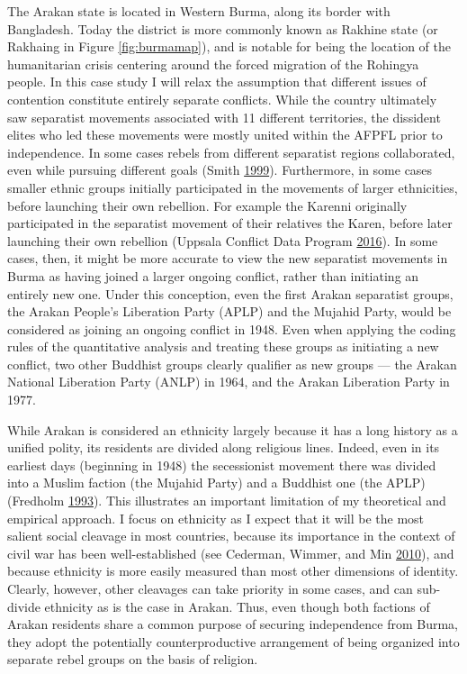 \documentclass[12pt,]{book}
\theoremstyle{definition}
\theoremstyle{definition}
\theoremstyle{definition}
\theoremstyle{remark}
\begin{document}
The Arakan state is located in Western Burma, along its border with
Bangladesh. Today the district is more commonly known as Rakhine state
(or Rakhaing in Figure \ref{fig:burmamap}), and is notable for being the
location of the humanitarian crisis centering around the forced
migration of the Rohingya people. In this case study I will relax the
assumption that different issues of contention constitute entirely
separate conflicts. While the country ultimately saw separatist
movements associated with 11 different territories, the dissident elites
who led these movements were mostly united within the AFPFL prior to
independence. In some cases rebels from different separatist regions
collaborated, even while pursuing different goals (Smith
\protect\hyperlink{ref-Smith1999}{1999}). Furthermore, in some cases
smaller ethnic groups initially participated in the movements of larger
ethnicities, before launching their own rebellion. For example the
Karenni originally participated in the separatist movement of their
relatives the Karen, before later launching their own rebellion (Uppsala
Conflict Data Program \protect\hyperlink{ref-UCDPEncyclopedia}{2016}).
In some cases, then, it might be more accurate to view the new
separatist movements in Burma as having joined a larger ongoing
conflict, rather than initiating an entirely new one. Under this
conception, even the first Arakan separatist groups, the Arakan People's
Liberation Party (APLP) and the Mujahid Party, would be considered as
joining an ongoing conflict in 1948. Even when applying the coding rules
of the quantitative analysis and treating these groups as initiating a
new conflict, two other Buddhist groups clearly qualifier as new groups
--- the Arakan National Liberation Party (ANLP) in 1964, and the Arakan
Liberation Party in 1977.

While Arakan is considered an ethnicity largely because it has a long
history as a unified polity, its residents are divided along religious
lines. Indeed, even in its earliest days (beginning in 1948) the
secessionist movement there was divided into a Muslim faction (the
Mujahid Party) and a Buddhist one (the APLP) (Fredholm
\protect\hyperlink{ref-Fredholm1993}{1993}). This illustrates an
important limitation of my theoretical and empirical approach. I focus
on ethnicity as I expect that it will be the most salient social
cleavage in most countries, because its importance in the context of
civil war has been well-established (see Cederman, Wimmer, and Min
\protect\hyperlink{ref-Cederman2010}{2010}), and because ethnicity is
more easily measured than most other dimensions of identity. Clearly,
however, other cleavages can take priority in some cases, and can
sub-divide ethnicity as is the case in Arakan. Thus, even though both
factions of Arakan residents share a common purpose of securing
independence from Burma, they adopt the potentially counterproductive
arrangement of being organized into separate rebel groups on the basis
of religion.
\end{document}
